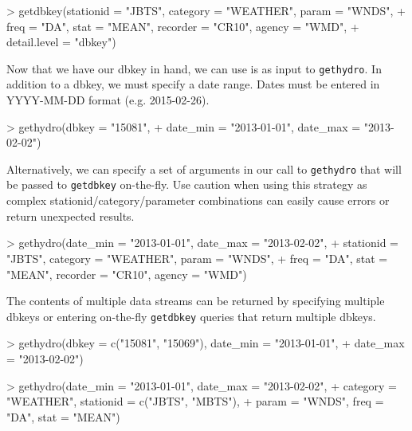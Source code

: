 \documentclass[12pt,notitlepage]{article}
\begin{document}
\begin{Schunk}
\begin{Sinput}
> getdbkey(stationid = "JBTS", category = "WEATHER", param = "WNDS",
+          freq = "DA", stat = "MEAN", recorder = "CR10", agency = "WMD",
+          detail.level = "dbkey")
\end{Sinput}
\end{Schunk}

\noindent Now that we have our dbkey in hand, we can use is as input to \texttt{gethydro}. In addition to a dbkey, we must specify a date range. Dates must be entered in YYYY-MM-DD format (e.g. 2015-02-26).

\begin{Schunk}
\begin{Sinput}
> gethydro(dbkey = "15081",
+          date_min = "2013-01-01", date_max = "2013-02-02")
\end{Sinput}
\end{Schunk}

\noindent Alternatively, we can specify a set of arguments in our call to \texttt{gethydro} that will be passed to \texttt{getdbkey} on-the-fly. Use caution when using this strategy as complex stationid/category/parameter combinations can easily cause errors or return unexpected results. 

\begin{Schunk}
\begin{Sinput}
> gethydro(date_min = "2013-01-01", date_max = "2013-02-02",
+          stationid = "JBTS", category = "WEATHER", param = "WNDS",
+          freq = "DA", stat = "MEAN", recorder = "CR10", agency = "WMD")
\end{Sinput}
\end{Schunk}

\noindent The contents of multiple data streams can be returned by specifying multiple dbkeys or entering on-the-fly \texttt{getdbkey} queries that return multiple dbkeys.

\begin{Schunk}
\begin{Sinput}
> gethydro(dbkey = c("15081", "15069"), date_min = "2013-01-01",
+          date_max = "2013-02-02")
\end{Sinput}
\end{Schunk}

\begin{Schunk}
\begin{Sinput}
> gethydro(date_min = "2013-01-01", date_max = "2013-02-02",
+          category = "WEATHER", stationid = c("JBTS", "MBTS"),
+          param = "WNDS", freq = "DA", stat = "MEAN")
\end{Sinput}
\end{Schunk}
\end{document}
